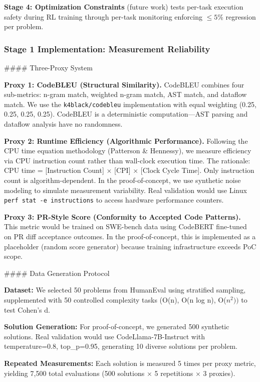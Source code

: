 \textbf{Stage 4: Optimization Constraints} (future work) tests per-task execution safety during RL training through per-task monitoring enforcing $\leq 5$\% regression per problem.

\subsubsection{Stage 1 Implementation: Measurement Reliability}

\#\#\#\# Three-Proxy System

\textbf{Proxy 1: CodeBLEU (Structural Similarity).} CodeBLEU combines four sub-metrics: n-gram match, weighted n-gram match, AST match, and dataflow match. We use the \texttt{k4black/codebleu} implementation with equal weighting (0.25, 0.25, 0.25, 0.25). CodeBLEU is a deterministic computation---AST parsing and dataflow analysis have no randomness.

\textbf{Proxy 2: Runtime Efficiency (Algorithmic Performance).} Following the CPU time equation methodology (Patterson \& Hennessy), we measure efficiency via CPU instruction count rather than wall-clock execution time. The rationale: CPU time = [Instruction Count] $\times$ [CPI] $\times$ [Clock Cycle Time]. Only instruction count is algorithm-dependent. In the proof-of-concept, we use synthetic noise modeling to simulate measurement variability. Real validation would use Linux \texttt{perf stat -e instructions} to access hardware performance counters.

\textbf{Proxy 3: PR-Style Score (Conformity to Accepted Code Patterns).} This metric would be trained on SWE-bench data using CodeBERT fine-tuned on PR diff acceptance outcomes. In the proof-of-concept, this is implemented as a placeholder (random score generator) because training infrastructure exceeds PoC scope.

\#\#\#\# Data Generation Protocol

\textbf{Dataset:} We selected 50 problems from HumanEval using stratified sampling, supplemented with 50 controlled complexity tasks (O(n), O(n log n), O($n^{2}))$ to test Cohen's d.

\textbf{Solution Generation:} For proof-of-concept, we generated 500 synthetic solutions. Real validation would use CodeLlama-7B-Instruct with temperature=0.8, top\_p=0.95, generating 10 diverse solutions per problem.

\textbf{Repeated Measurements:} Each solution is measured 5 times per proxy metric, yielding 7,500 total evaluations (500 solutions $\times$ 5 repetitions $\times$ 3 proxies).

